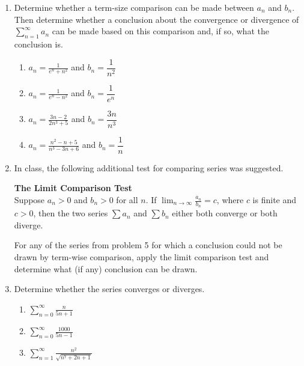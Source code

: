 \documentclass{article}
\begin{document}
\begin{enumerate}
\begin{enumerate}
                        \end{enumerate}
                    \item Determine whether a term-size comparison can be made between $a_n$ and $b_n$.  Then determine whether a conclusion about the convergence or divergence of  $\displaystyle \sum_{n=1}^\infty a_n$ can be made based on this comparison and, if so, what the conclusion is.
                        \begin{enumerate}
                            \item $\displaystyle a_n =\frac{1}{e^n+n^2}$ and $\displaystyle b_n=\dfrac{1}{n^2}$
                            \item $\displaystyle a_n =\frac{1}{e^n-n^2}$ and $\displaystyle b_n=\dfrac{1}{e^n}$ 
                            \item  $\displaystyle a_n = \frac{3n-2}{2n^3+5}$ and $b_n=\dfrac{3n}{n^3}$
                            \item $\displaystyle a_n = \frac{n^2-n+5}{n^3-3n+6}$ and $b_n=\dfrac{1}{n}$
                        \end{enumerate}
                    \item In class, the following additional test for comparing series was suggested.                   \begin{framed}
                    \noindent \textbf{The Limit Comparison Test}\\
                    Suppose $a_n>0$ and $b_n>0$ for all $n$.  If $\displaystyle \lim_{n\rightarrow\infty}\frac{a_n}{b_n} = c$, where $c$ is finite and $c>0$, then the two series $\sum a_n$ and $\sum b_n$ either both converge or both diverge.
                    \end{framed} 
                    For any of the series from problem 5 for which a conclusion could not be  drawn by term-wise comparison, apply the limit comparison test and determine what (if any) conclusion can be drawn.              
                    \item Determine whether the series converges or diverges.
                        \begin{enumerate}
                            \item $\displaystyle \sum_{n=0}^\infty \frac{n}{5n+1}$
                            \item $\displaystyle \sum_{n=0}^\infty \frac{1000}{5n-1}$   
                            \item $\displaystyle \sum_{n=1}^\infty \frac{n^2}{\sqrt{n^7+2n+1}}$

\end{enumerate}
\end{enumerate}
\end{document}
